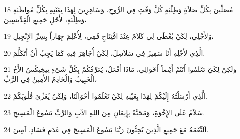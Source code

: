 \par 18 مُصَلِّينَ بِكُلِّ صَلاَةٍ وَطِلْبَةٍ كُلَّ وَقْتٍ فِي الرُّوحِ، وَسَاهِرِينَ لِهَذَا بِعَيْنِهِ بِكُلِّ مُواظَبَةٍ وَطِلْبَةٍ، لأَجْلِ جَمِيعِ الْقِدِّيسِينَ،
\par 19 وَلأَجْلِي، لِكَيْ يُعْطَى لِي كَلاَمٌ عِنْدَ افْتِتَاحِ فَمِي، لِأُعْلِمَ جِهَاراً بِسِرِّ الإِنْجِيلِ،
\par 20 الَّذِي لأَجْلِهِ أَنَا سَفِيرٌ فِي سَلاَسِلَ، لِكَيْ أُجَاهِرَ فِيهِ كَمَا يَجِبُ أَنْ أَتَكَلَّمَ.
\par 21 وَلَكِنْ لِكَيْ تَعْلَمُوا أَنْتُمْ أَيْضاً أَحْوَالِي، مَاذَا أَفْعَلُ، يُعَرِّفُكُمْ بِكُلِّ شَيْءٍ تِيخِيكُسُ الأَخُ الْحَبِيبُ وَالْخَادِمُ الأَمِينُ فِي الرَّبِّ،
\par 22 الَّذِي أَرْسَلْتُهُ إِلَيْكُمْ لِهَذَا بِعَيْنِهِ لِكَيْ تَعْلَمُوا أَحْوَالَنَا، وَلِكَيْ يُعَزِّيَ قُلُوبَكُمْ.
\par 23 سَلاَمٌ عَلَى الإِخْوَةِ، وَمَحَبَّةٌ بِإِيمَانٍ مِنَ اللهِ الآبِ وَالرَّبِّ يَسُوعَ الْمَسِيحِ.
\par 24 اَلنِّعْمَةُ مَعَ جَمِيعِ الَّذِينَ يُحِبُّونَ رَبَّنَا يَسُوعَ الْمَسِيحَ فِي عَدَمِ فَسَادٍ. آمِينَ.

